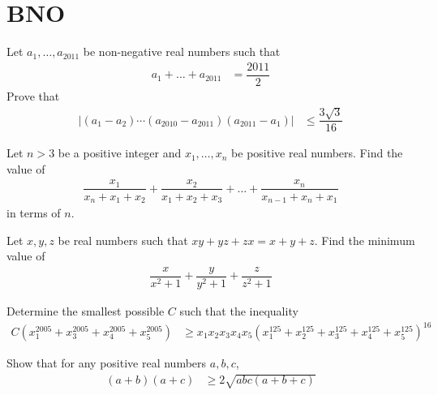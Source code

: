 \documentclass{subfile}
\begin{document}
	\section{BNO}\label{sec:bno}
	
		\begin{problem}[$2011$, problem $6$]
			Let $a_{1},\ldots,a_{2011}$ be non-negative real numbers such that
				\begin{align*}
					a_{1}+\ldots+a_{2011}
						& = \dfrac{2011}{2}
				\end{align*}
			Prove that
				\begin{align*}
					|(a_{1}-a_{2})\cdots(a_{2010}-a_{2011})(a_{2011}-a_{1})|
						& \leq\dfrac{3\sqrt{3}}{16}
				\end{align*}
		\end{problem}
	
		\begin{problem}[$2009$, problem $3$]
			Let $n>3$ be a positive integer and $x_{1},\ldots,x_{n}$ be positive real numbers. Find the value of
				\begin{align*}
					\dfrac{x_{1}}{x_{n}+x_{1}+x_{2}}+\dfrac{x_{2}}{x_{1}+x_{2}+x_{3}}+\ldots+\dfrac{x_{n}}{x_{n-1}+x_{n}+x_{1}}
				\end{align*}
			in terms of $n$.
		\end{problem}
	
		\begin{problem}[$2008$, problem $3$]
			Let $x,y,z$ be real numbers such that $xy+yz+zx=x+y+z$. Find the minimum value of
				\begin{align*}
					\dfrac{x}{x^{2}+1}+\dfrac{y}{y^{2}+1}+\dfrac{z}{z^{2}+1}
				\end{align*}
		\end{problem}
	
		\begin{problem}[$2005$, problem $2$]
			Determine the smallest possible $C$ such that the inequality
				\begin{align*}
					C\left(x_{1}^{2005}+x_{3}^{2005}+x_{4}^{2005}+x_{5}^{2005}\right)
						& \geq x_{1}x_{2}x_{3}x_{4}x_{5}\left(x_{1}^{125}+x_{2}^{125}+x_{3}^{125}+x_{4}^{125}+x_{5}^{125}\right)^{16}
				\end{align*}
		\end{problem}
	
		\begin{problem}[$2001$, problem $1$]
			Show that for any positive real numbers $a,b,c$,
				\begin{align*}
					(a+b)(a+c)
						& \geq 2\sqrt{abc(a+b+c)}
				\end{align*}
		\end{problem}
\end{document}
